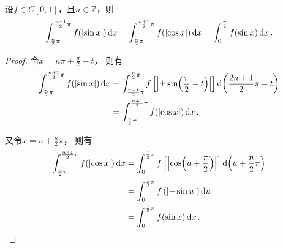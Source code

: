 \begin{proposition}\label{theorem:定积分.正余弦函数的复合的积分2}
设\(f \in C[0,1]\)，且\(n\in\mathbb{Z}\)，则\begin{equation}
	\int_{\frac{n}{2} \pi}^{\frac{n+1}{2} \pi} f(\abs{\sin x}) \dd{x}
	= \int_{\frac{n}{2} \pi}^{\frac{n+1}{2} \pi} f(\abs{\cos x}) \dd{x}
	= \int_0^{\frac{\pi}{2}} f(\sin x) \dd{x}.
\end{equation}
\def\arraystretch{1.5}
\begin{proof}
令\(x = n\pi+\frac{\pi}{2}-t\)，
则有\begin{align*}
	\int_{\frac{n}{2} \pi}^{\frac{n+1}{2} \pi} f(\abs{\sin x}) \dd{x}
	&= \int_{\frac{n+1}{2} \pi}^{\frac{n}{2} \pi} f\left[\abs{\pm\sin(\frac{\pi}{2}-t)}\right] \dd(\frac{2n+1}{2}\pi-t) \\
	&= \int_{\frac{n}{2} \pi}^{\frac{n+1}{2} \pi} f(\abs{\cos x}) \dd{x}.
\end{align*}

又令\(x=u+\frac{n}{2} \pi\)，
则有\begin{align*}
	\int_{\frac{n}{2} \pi}^{\frac{n+1}{2} \pi} f(\abs{\cos x}) \dd{x}
	&= \int_0^{\frac{1}{2}\pi} f\left[ \abs{\cos(u+\frac{\pi}{2})} \right] \dd(u+\frac{n}{2}\pi) \\
	&= \int_0^{\frac{1}{2}\pi} f\left( \abs{-\sin u} \right) \dd{u} \\
	&= \int_0^{\frac{1}{2}\pi} f(\sin x) \dd{x}.
	\qedhere
\end{align*}
\end{proof}
\end{proposition}
